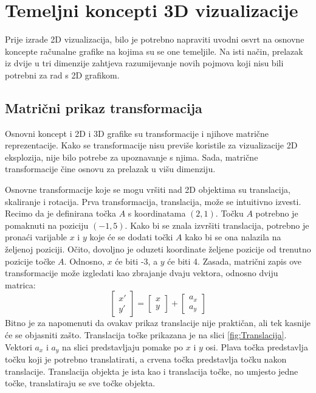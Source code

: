 \documentclass{foi}
\begin{document}
\chapter{Temeljni koncepti 3D vizualizacije}
Prije izrade 2D vizualizacija, bilo je potrebno napraviti uvodni osvrt na osnovne koncepte računalne grafike na kojima su se one temeljile. Na isti način, prelazak iz dvije u tri dimenzije zahtjeva razumijevanje novih pojmova koji nisu bili potrebni za rad s 2D grafikom.  

\section{Matrični prikaz transformacija}
Osnovni koncept i 2D i 3D grafike su transformacije i njihove matrične reprezentacije. Kako se transformacije nisu previše koristile za vizualizacije 2D eksplozija, nije bilo potrebe za upoznavanje s njima. Sada, matrične transformacije čine osnovu za prelazak u višu dimenziju.

Osnovne transformacije koje se mogu vršiti nad 2D objektima su translacija, skaliranje i rotacija. Prva transformacija, translacija, može se intuitivno izvesti. Recimo da je definirana točka $A$ s koordinatama $(2, 1)$. Točku $A$ potrebno je pomaknuti na poziciju $(-1, 5)$. Kako bi se znala izvršiti translacija, potrebno je pronaći varijable $x$ i $y$ koje će se dodati točki $A$ kako bi se ona nalazila na željenoj poziciji. Očito, dovoljno je oduzeti koordinate željene pozicije od trenutno pozicije točke $A$. Odnosno, $x$ će biti -3, a $y$ će biti 4. Zasada, matrični zapis ove transformacije može izgledati kao zbrajanje dvaju vektora, odnosno dviju matrica:
\[
\begin{bmatrix}
x'\\
y' 
\end{bmatrix}
=
\begin{bmatrix}
x\\
y
\end{bmatrix}
+
\begin{bmatrix}
a_x\\
a_y
\end{bmatrix}
\]
Bitno je za napomenuti da ovakav prikaz translacije nije praktičan, ali tek kasnije će se objasniti zašto. Translacija točke prikazana je na slici \ref{fig:Translacija}. Vektori $a_x$ i $a_y$ na slici predstavljaju pomake po $x$ i $y$ osi. Plava točka predstavlja točku koji je potrebno translatirati, a crvena točka predstavlja točku nakon translacije. Translacija objekta je ista kao i translacija točke, no umjesto jedne točke, translatiraju se sve točke objekta. 
\end{document}
